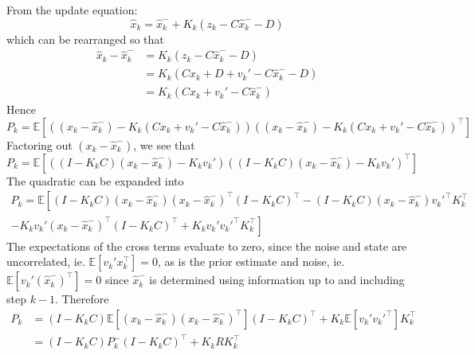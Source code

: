 \documentclass[11pt]{report} %
\begin{document}
From the update equation:
\begin{equation}
\hat{x}_{k} = \hat{x}_{k}^{-} + K_{k}\left(z_{k} - C\hat{x}_{k}^{-} - D\right)
\end{equation}
which can be rearranged so that
\begin{align}
\hat{x}_{k} - \hat{x}_{k}^{-}  &= K_{k}\left(z_{k} - C\hat{x}_{k}^{-} - D\right) \\
&= K_{k}\left(Cx_{k} + D + v_{k}' - C\hat{x}_{k}^{-} - D\right) \\
&= K_{k}\left(Cx_{k} + v_{k}' - C\hat{x}_{k}^{-}\right)
\end{align}
Hence
\begin{equation}
P_{k} = \mathbb{E}\left[\left(\left(x_{k} - \hat{x}_{k}^{-}\right) - K_{k}\left(Cx_{k} + v_{k}' - C\hat{x}_{k}^{-}\right)\right)\left(\left(x_{k} - \hat{x}_{k}^{-}\right) - K_{k}\left(Cx_{k} + v_{k}' - C\hat{x}_{k}^{-}\right)\right)^{\top}\right]
\end{equation}
Factoring out $\left(x_{k} - \hat{x}_{k}^{-}\right)$, we see that
\begin{equation}
P_{k} = \mathbb{E}\left[\left(\left(I - K_{k}C\right)\left(x_{k} - \hat{x}_{k}^{-}\right) - K_{k}v_{k}'\right)\left(\left(I - K_{k}C\right)\left(x_{k} - \hat{x}_{k}^{-}\right) - K_{k}v_{k}'\right)^{\top}\right]
\end{equation}
The quadratic can be expanded into
\begin{multline}
P_{k} =  \mathbb{E}\left[\left(I - K_{k}C\right)\left(x_{k} - \hat{x}_{k}^{-}\right)\left(x_{k} - \hat{x}_{k}^{-}\right)^{\top}\left(I - K_{k}C\right)^{\top} - \left(I - K_{k}C\right)\left(x_{k} - \hat{x}_{k}^{-}\right)v_{k}'^{\top}K_{k}^{\top} \right. \\
\left. - K_{k}v_{k}'\left(x_{k} - \hat{x}_{k}^{-}\right)^{\top}\left(I - K_{k}C\right)^{\top} + K_{k}v_{k}'v_{k}'^{\top}K_{k}^{\top} \right]
\end{multline}
The expectations of the cross terms evaluate to zero, since the noise and state are uncorrelated, ie. $\mathbb{E}\left[v_{k}'x_{k}^{\top}\right] = 0$, as is the prior estimate and noise, ie. $\mathbb{E}\left[v_{k}'\left(\hat{x}_{k}^{-}\right)^{\top}\right] = 0$ since $\hat{x}_{k}^{-}$ is determined using information up to and including step $k - 1$. Therefore
\begin{align}
P_{k} &= \left(I - K_{k}C\right)\mathbb{E}\left[\left(x_{k} - \hat{x}_{k}^{-}\right)\left(x_{k} - \hat{x}_{k}^{-}\right)^{\top}\right]\left(I - K_{k}C\right)^{\top} + K_{k}\mathbb{E}\left[v_{k}'v_{k}'^{\top}\right]K_{k}^{\top} \\
&= \left(I - K_{k}C\right)P_{k}^{-}\left(I - K_{k}C\right)^{\top} + K_{k}RK_{k}^{\top}
\end{align}
\end{document}
